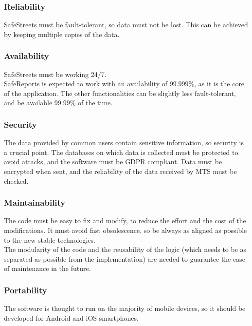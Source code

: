\documentclass[a4paper]{article}
\begin{document}
\subsubsection{Reliability}

SafeStreets must be fault-tolerant, so data must not be lost. This can
be achieved by keeping multiple copies of the data.

\subsubsection{Availability}

SafeStreets must be working 24/7.\\
SafeReports is expected to work with an availability of 99.999\%, as it
is the core of the application. The other functionalities can be
slightly less fault-tolerant, and be available 99.99\% of the time.

\subsubsection{Security}

The data provided by common users contain sensitive information, so
security is a crucial point. The databases on which data is collected
must be protected to avoid attacks, and the software must be GDPR
compliant. Data must be encrypted when sent, and the reliability of the
data received by MTS must be checked.

\subsubsection{Maintainability}

The code must be easy to fix and modify, to reduce the effort and the
cost of the modifications. It must avoid fast obsolescence, so be always
as aligned as possible to the new stable technologies.\\
The modularity of the code and the reusability of the logic (which needs
to be as separated as possible from the implementation) are needed to
guarantee the ease of maintenance in the future.

\subsubsection{Portability}

The software is thought to run on the majority of mobile devices, so it
should be developed for Android and iOS smartphones.
\end{document}
